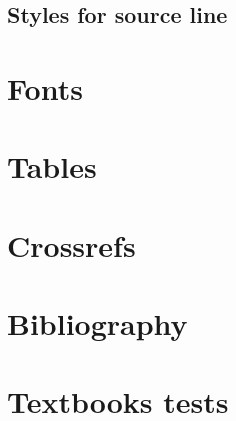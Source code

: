 \documentclass[biblatex
	      ,output=draft
	      ,nonflat
	      ,modfonts
	      ]{langsci/langscibook}
\begin{document}
 

\subsection{Styles for source line}

\section{Fonts}
% 

\section{Tables}\label{sec:tables}

\section{Crossrefs}

\section{Bibliography}
 
%  

% 
%  
 
\section{Textbooks tests}
 
 



\end{document}
